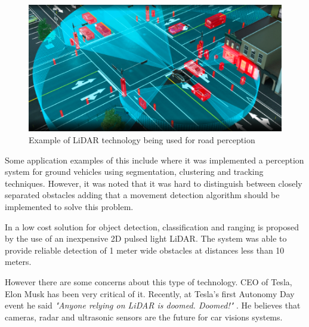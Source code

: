  
\begin{figure}[h] 
\centerline{\includegraphics [width=0.7 \textwidth]{imgs/chapter2/lidarcar.png}}
\caption{Example of \ac{LiDAR} technology being used for road perception \cite{lidarcar}}
\label{fig:lidarcar}
\end{figure}

Some application examples of this include \cite{lidarperception}  where it was implemented a perception system for ground vehicles using segmentation, clustering and tracking techniques.  However, it was noted that it was hard to distinguish between closely separated obstacles adding that a movement detection algorithm should be implemented to solve this problem. 


In \cite{car2dlidar} a low cost solution for object detection, classification and ranging is  proposed by the use of an inexpensive 2D pulsed light \ac{LiDAR}. The system was able to provide reliable detection of 1 meter wide obstacles at distances less than 10 meters.


However there are some concerns about this type of technology. CEO of Tesla, Elon Musk has been very critical of it. Recently, at Tesla’s first Autonomy Day event  he said \textit{"Anyone relying on \ac{LiDAR} is doomed. Doomed!"} \cite{elon}. He believes that cameras, \ac{radar} and ultrasonic sensors are the future for car visions systems. 
